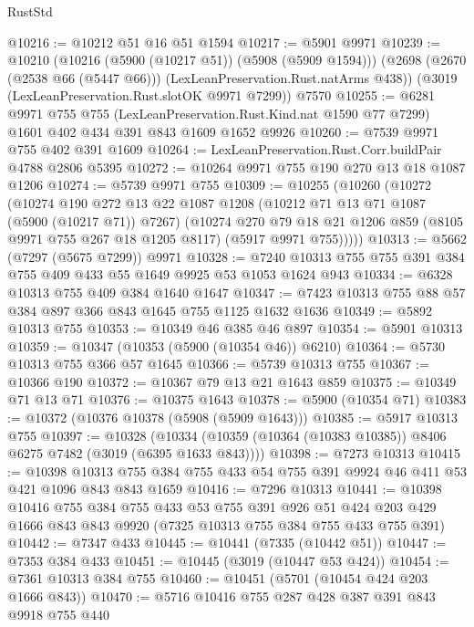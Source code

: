 \begin{lexlean}{RustStd}
\begin{coremodule}
@10216 := @10212 @51 @16 @51 @1594
@10217 := @5901 @9971
@10239 := @10210
    (@10216 (@5900 (@10217 @51)) (@5908 (@5909 @1594)))
    (@2698 (@2670 (@2538 @66 (@5447 @66))) (LexLeanPreservation.Rust.natArms @438))
    (@3019 (LexLeanPreservation.Rust.slotOK @9971 @7299))
    @7570
@10255 := @6281
    @9971
    @755
    @755
    (LexLeanPreservation.Rust.Kind.nat @1590 @77 @7299)
    @1601
    @402
    @434
    @391
    @843
    @1609
    @1652
    @9926
@10260 := @7539 @9971 @755 @402 @391 @1609
@10264 := LexLeanPreservation.Rust.Corr.buildPair @4788 @2806 @5395
@10272 := @10264 @9971 @755 @190 @270 @13 @18 @1087 @1206
@10274 := @5739 @9971 @755
@10309 := @10255
    (@10260
      (@10272
        (@10274
          @190
          @272
          @13
          @22
          @1087
          @1208
          (@10212 @71 @13 @71 @1087 (@5900 (@10217 @71)) @7267)
          (@10274
            @270
            @79
            @18
            @21
            @1206
            @859
            (@8105 @9971 @755 @267 @18 @1205 @8117)
            (@5917 @9971 @755)))))
@10313 := @5662 (@7297 (@5675 @7299)) @9971
@10328 := @7240 @10313 @755 @755 @391 @384 @755 @409 @433 @55 @1649 @9925 @53 @1053 @1624 @943
@10334 := @6328 @10313 @755 @409 @384 @1640 @1647
@10347 := @7423 @10313 @755 @88 @57 @384 @897 @366 @843 @1645 @755 @1125 @1632 @1636
@10349 := @5892 @10313 @755
@10353 := @10349 @46 @385 @46 @897
@10354 := @5901 @10313
@10359 := @10347 (@10353 (@5900 (@10354 @46)) @6210)
@10364 := @5730 @10313 @755 @366 @57 @1645
@10366 := @5739 @10313 @755
@10367 := @10366 @190
@10372 := @10367 @79 @13 @21 @1643 @859
@10375 := @10349 @71 @13 @71
@10376 := @10375 @1643
@10378 := @5900 (@10354 @71)
@10383 := @10372 (@10376 @10378 (@5908 (@5909 @1643)))
@10385 := @5917 @10313 @755
@10397 := @10328
    (@10334 (@10359 (@10364 (@10383 @10385)) @8406 @6275 @7482 (@3019 (@6395 @1633 @843))))
@10398 := @7273 @10313
@10415 := @10398
    @10313
    @755
    @384
    @755
    @433
    @54
    @755
    @391
    @9924
    @46
    @411
    @53
    @421
    @1096
    @843
    @843
    @1659
@10416 := @7296 @10313
@10441 := @10398
    @10416
    @755
    @384
    @755
    @433
    @53
    @755
    @391
    @926
    @51
    @424
    @203
    @429
    @1666
    @843
    @843
    @9920
    (@7325 @10313 @755 @384 @755 @433 @755 @391)
@10442 := @7347 @433
@10445 := @10441 (@7335 (@10442 @51))
@10447 := @7353 @384 @433
@10451 := @10445 (@3019 (@10447 @53 @424))
@10454 := @7361 @10313 @384 @755
@10460 := @10451 (@5701 (@10454 @424 @203 @1666 @843))
@10470 := @5716 @10416 @755 @287 @428 @387 @391 @843 @9918 @755 @440

\end{coremodule}
\end{lexlean}
